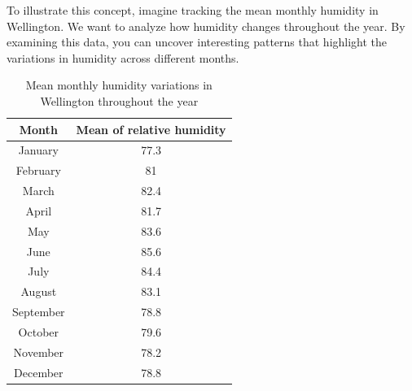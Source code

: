 
To illustrate this concept, imagine tracking the mean monthly humidity in Wellington. We want to analyze how humidity changes throughout the year. By examining this data, you can uncover interesting patterns that highlight the variations in humidity across different months. 



\begin{table}[ht]
	\caption{Mean monthly humidity variations in Wellington throughout the year} %
	\centering %
	\begin{tabular}{c c } %
		\hline\hline %
		Month & Mean of relative humidity \\ [0.5ex] %
		\hline %
		January & 77.3 \\ %
		February & 81 \\
		March & 82.4 \\
		April & 81.7 \\
		May & 83.6 \\ 
		June & 85.6 \\
		July & 84.4 \\
		August & 83.1 \\ 
		September & 78.8 \\
		October & 79.6 \\
		November & 78.2 \\
		December & 78.8 \\ [1ex] %
		\hline %
	\end{tabular}
	\label{table:nonlin} %
\end{table}

